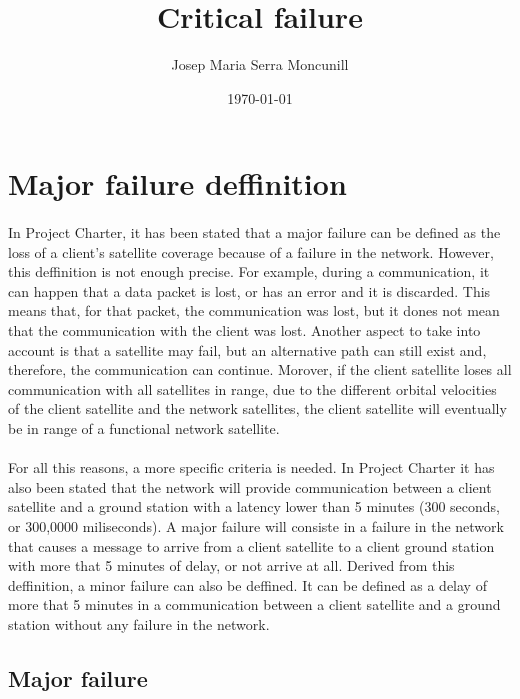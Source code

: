 \documentclass[12pt,a4paper]{report}
\author{Josep Maria Serra Moncunill}
\title{Critical failure}
\date{\today}
\begin{document}
\maketitle
\tableofcontents
\listoffigures
\listoftables

\section{Major failure deffinition}

\paragraph{}In Project Charter, it has been stated that a major failure can be defined as the loss of a client’s satellite coverage because of a failure in the network. However, this deffinition is not enough precise. For example, during a communication, it can happen that a data packet is lost, or has an error and it is discarded. This means that, for that packet, the communication was lost, but it dones not mean that the communication with the client was lost. Another aspect to take into account is that a satellite may fail, but an alternative path can still exist and, therefore, the communication can continue. Morover, if the client satellite loses all communication with all satellites in range, due to the different orbital velocities of the client satellite and the network satellites, the client satellite will eventually be in range of a functional network satellite.

\paragraph{}For all this reasons, a more specific criteria is needed. In Project Charter it has also been stated that the network will provide communication between a client satellite and a ground station with a latency lower than 5 minutes (300 seconds, or 300,0000 miliseconds). A major failure will consiste in a failure in the network that causes a message to arrive from a client satellite to a client ground station with more that 5 minutes of delay, or not arrive at all. Derived from this deffinition, a minor failure can also be deffined. It can be defined as a delay of more that 5 minutes in a communication between a client satellite and a ground station without any failure in the network.

\subsection{Major failure}
\end{document}
